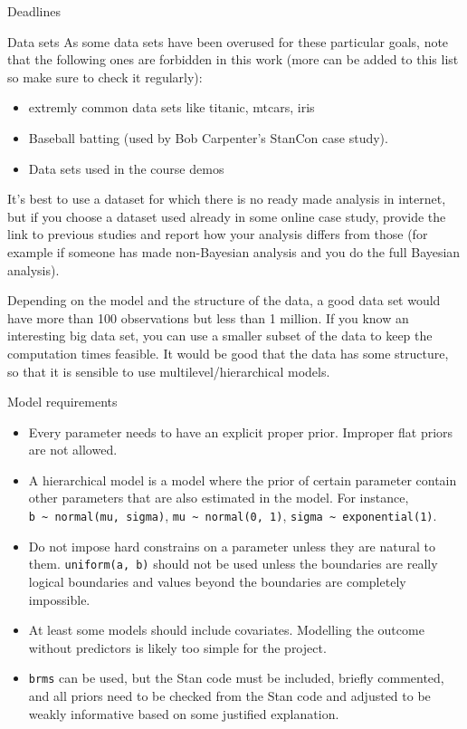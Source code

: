 \documentclass[
  13pt,
  ignorenonframetext,
]{beamer}
\providecommand{\tightlist}{%
  \setlength{\itemsep}{0pt}\setlength{\parskip}{0pt}}
\begin{document}
\begin{frame}[fragile]{Deadlines}
\begin{block}{Data sets}
\protect\hypertarget{data-sets}{}
As some data sets have been overused for these particular goals, note
that the following ones are forbidden in this work (more can be added to
this list so make sure to check it regularly):

\begin{itemize}
\tightlist
\item
  extremly common data sets like titanic, mtcars, iris
\item
  Baseball batting (used by Bob Carpenter's StanCon case study).
\item
  Data sets used in the course demos
\end{itemize}

It's best to use a dataset for which there is no ready made analysis in
internet, but if you choose a dataset used already in some online case
study, provide the link to previous studies and report how your analysis
differs from those (for example if someone has made non-Bayesian
analysis and you do the full Bayesian analysis).

Depending on the model and the structure of the data, a good data set
would have more than 100 observations but less than 1 million. If you
know an interesting big data set, you can use a smaller subset of the
data to keep the computation times feasible. It would be good that the
data has some structure, so that it is sensible to use
multilevel/hierarchical models.
\end{block}

\begin{block}{Model requirements}
\protect\hypertarget{model-requirements}{}
\begin{itemize}
\tightlist
\item
  Every parameter needs to have an explicit proper prior. Improper flat
  priors are not allowed.
\item
  A hierarchical model is a model where the prior of certain parameter
  contain other parameters that are also estimated in the model. For
  instance, \texttt{b\ \textasciitilde{}\ normal(mu,\ sigma)},
  \texttt{mu\ \textasciitilde{}\ normal(0,\ 1)},
  \texttt{sigma\ \textasciitilde{}\ exponential(1)}.
\item
  Do not impose hard constrains on a parameter unless they are natural
  to them. \texttt{uniform(a,\ b)} should not be used unless the
  boundaries are really logical boundaries and values beyond the
  boundaries are completely impossible.
\item
  At least some models should include covariates. Modelling the outcome
  without predictors is likely too simple for the project.
\item
  \texttt{brms} can be used, but the Stan code must be included, briefly
  commented, and all priors need to be checked from the Stan code and
  adjusted to be weakly informative based on some justified explanation.
\end{itemize}
\end{block}


\end{frame}
\end{document}
